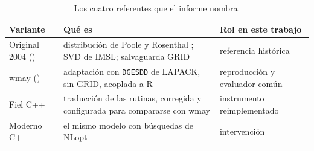 \begin{table}[htbp]
\centering
\caption{Los cuatro referentes que el informe nombra.}
\label{tab:referentes}
\footnotesize
\begin{tabular}{L{3.9cm}L{5.6cm}L{2.8cm}}
\toprule
Variante & Qué es & Rol en este trabajo \\
\midrule
Original 2004 () & distribución de Poole y Rosenthal
\parencite{poole2005spatial}; SVD de IMSL; salvaguarda GRID & referencia histórica \\
wmay () & adaptación \parencite{wmay_dwnominate} con
\texttt{DGESDD} de LAPACK, sin GRID, acoplada a R & reproducción y evaluador común \\
Fiel C++ & traducción de las rutinas, corregida y configurada para compararse con wmay &
instrumento reimplementado \\
Moderno C++ & el mismo modelo con búsquedas de NLopt \parencite{johnson_nlopt} &
intervención \\
\bottomrule
\end{tabular}
\end{table}
